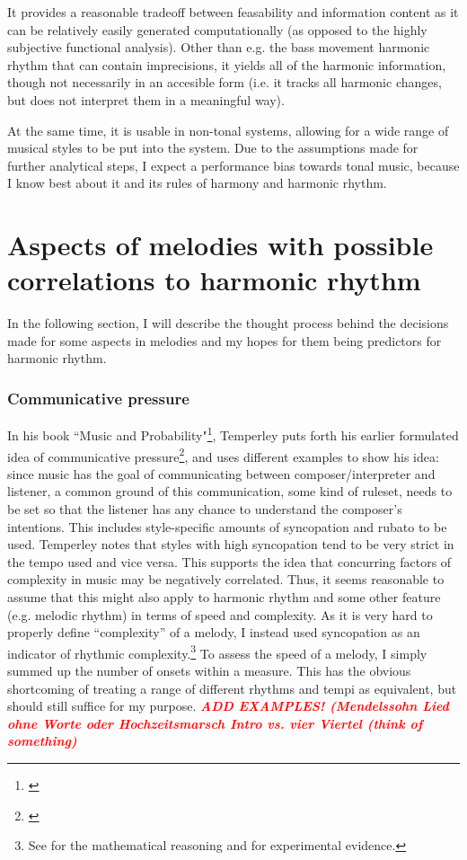 \documentclass[a4paper,12pt]{report}
\begin{document}
It provides a reasonable tradeoff between feasability and information content as it can be relatively easily generated computationally (as opposed to the highly subjective functional analysis). Other than e.g. the bass movement harmonic rhythm that can contain imprecisions, it yields all of the harmonic information, though not necessarily in an accesible form (i.e. it tracks all harmonic changes, but does not interpret them in a meaningful way).

At the same time, it is usable in non-tonal systems, allowing for a wide range of musical styles to be put into the system. Due to the assumptions made for further analytical steps, I expect a performance bias towards tonal music, because I know best about it and its rules of harmony and harmonic rhythm.

\section{Aspects of melodies with possible correlations to harmonic rhythm}
In the following section, I will describe the thought process behind the decisions made for some aspects in melodies and my hopes for them being predictors for harmonic rhythm.

\subsubsection{Communicative pressure}
In his book ``Music and Probability"\footnote{\cite{temperley2007music}}, Temperley puts forth his earlier formulated idea of communicative pressure\footnote{\cite{temperley2004communicative}}, and uses different examples to show his idea: since music has the goal of communicating between composer/interpreter and listener, a common ground of this communication, some kind of ruleset, needs to be set so that the listener has any chance to understand the composer's intentions. This includes style-specific amounts of syncopation and rubato to be used. Temperley notes that styles with high syncopation tend to be very strict in the tempo used and vice versa. This supports the idea that concurring factors of complexity in music may be negatively correlated. Thus, it seems reasonable to assume that this might also apply to harmonic rhythm and some other feature (e.g. melodic rhythm) in terms of speed and complexity. As it is very hard to properly define ``complexity'' of a melody, I instead used syncopation as an indicator of rhythmic complexity.\footnote{See \cite{gomez2005mathematical} for the mathematical reasoning and \cite{fitch2007perception} for experimental evidence.} To assess the speed of a melody, I simply summed up the number of onsets within a measure. This has the obvious shortcoming of treating a range of different rhythms and tempi as equivalent, but should still suffice for my purpose. \textbf{\textit{\textcolor{red}{ADD EXAMPLES! (Mendelssohn Lied ohne Worte oder Hochzeitsmarsch Intro vs. vier Viertel (think of something)}}}
\end{document}
